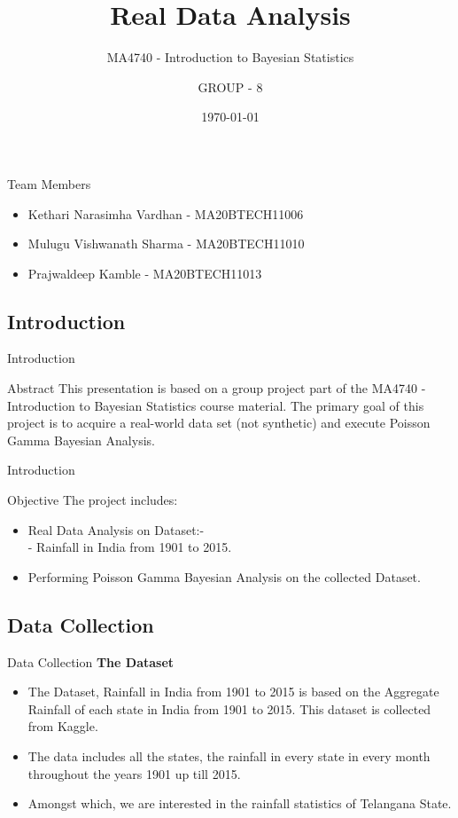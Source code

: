 \documentclass{beamer}
\title{Real Data Analysis}
\subtitle{MA4740 - Introduction to Bayesian Statistics}
\date{\today}
\author{GROUP - 8}
\begin{document}
\begin{frame}
\titlepage
\end{frame}
\begin{frame}{Team Members}
\begin{itemize}
    \item Kethari Narasimha Vardhan - MA20BTECH11006
    \item Mulugu Vishwanath Sharma - MA20BTECH11010
    \item Prajwaldeep Kamble - MA20BTECH11013
\end{itemize}
\end{frame}
\begin{frame}
\section{Introduction}
\end{frame}
\begin{frame}{Introduction}
   \begin{block}{Abstract}
     This presentation is based on a group project part of the MA4740 - Introduction to Bayesian Statistics course material. The primary goal of this project is to acquire a real-world data set (not synthetic) and execute Poisson Gamma Bayesian Analysis.
   \end{block} 
\end{frame}
\begin{frame}{Introduction}
   \begin{block}{Objective}
    The project includes:
    \begin{itemize}
    \item Real Data Analysis on Dataset:- \\
    - Rainfall in India from 1901 to 2015.
    \item Performing Poisson Gamma Bayesian Analysis on the collected Dataset.
\end{itemize}
   \end{block} 
\end{frame}
\begin{frame}
\section{Data Collection}
\end{frame}
\begin{frame}{Data Collection}
   \textbf{The Dataset}
     \begin{itemize}
    \item The Dataset, Rainfall in India from 1901 to 2015 is based on the Aggregate Rainfall of each state in India from 1901 to 2015. This dataset is collected from Kaggle.
    \item The data includes all the states, the rainfall in every state in every month throughout the years 1901 up till 2015.
    \item Amongst which, we are interested in the rainfall statistics of Telangana State.
\end{itemize}
\end{frame}
\end{document}
